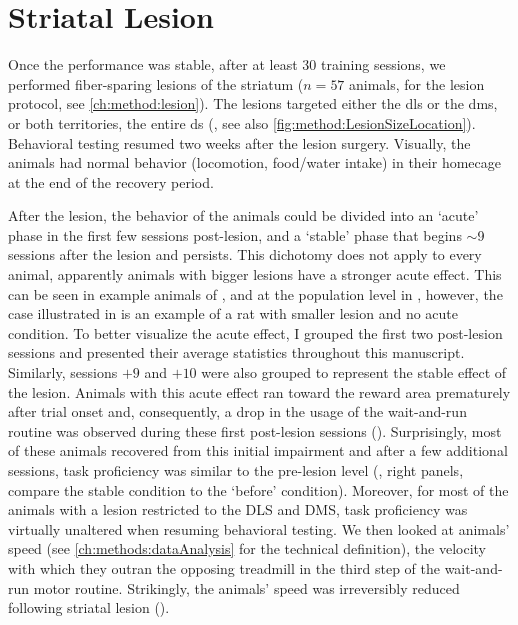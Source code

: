 \section{Striatal Lesion}
\label{ch:lesion:lesion}

Once the performance was stable, after at least 30 training sessions, we performed fiber-sparing lesions of the striatum ($n=57$ animals, for the lesion protocol, see \autoref{ch:method:lesion}).
The lesions targeted either the \gls{dls} or the \gls{dms}, or both territories, the entire \gls{ds} (, see also \autoref{fig:method:LesionSizeLocation}).
Behavioral testing resumed two weeks after the lesion surgery.
Visually, the animals had normal behavior (locomotion, food/water intake) in their homecage at the end of the recovery period.
\par
After the lesion, the behavior of the animals could be divided into an `acute' phase in the first few sessions post-lesion, and a `stable' phase that begins $\sim$9 sessions after the lesion and persists.
This dichotomy does not apply to every animal, apparently animals with bigger lesions have a stronger acute effect.
This can be seen in example animals of , and at the population level in , however, the case illustrated in  is an example of a rat with smaller lesion and no acute condition.
To better visualize the acute effect, I grouped the first two post-lesion sessions and presented their average statistics throughout this manuscript.
Similarly, sessions $+9$ and $+10$ were also grouped to represent the stable effect of the lesion.
Animals with this acute effect ran toward the reward area prematurely after trial onset and, consequently, a drop in the usage of the wait-and-run routine was observed during these first post-lesion sessions ().
Surprisingly, most of these animals recovered from this initial impairment and after a few additional sessions, task proficiency was similar to the pre-lesion level (, right panels, compare the stable condition to the `before' condition).
Moreover, for most of the animals with a lesion restricted to the DLS and DMS, task proficiency was virtually unaltered when resuming behavioral testing.
We then looked at animals' speed (see \autoref{ch:methods:dataAnalysis} for the technical definition), the velocity with which they outran the opposing treadmill in the third step of the wait-and-run motor routine.
Strikingly, the animals' speed was irreversibly reduced following striatal lesion ().
